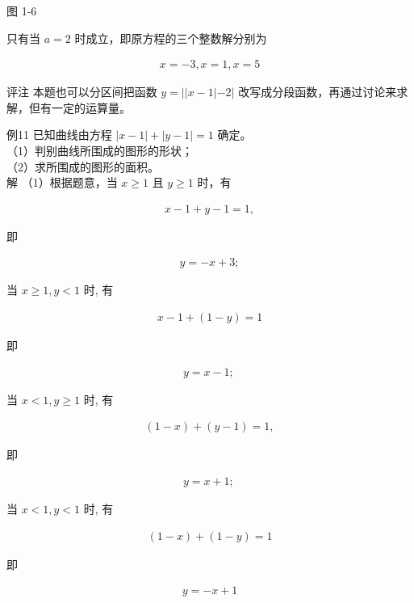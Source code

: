 \documentclass[10pt]{article}
\begin{document}
图 1-6

只有当 $a=2$ 时成立，即原方程的三个整数解分别为

\begin{align*}
x=-3, x=1, x=5
\end{align*}

评注 本题也可以分区间把函数 $y=||x-1|-2|$ 改写成分段函数，再通过讨论来求解，但有一定的运算量。

例11 已知曲线由方程 $|x-1|+|y-1|=1$ 确定。\\
（1）判别曲线所围成的图形的形状；\\
（2）求所围成的图形的面积。\\
解 （1）根据题意，当 $x \geqslant 1$ 且 $y \geqslant 1$ 时，有

\begin{align*}
x-1+y-1=1,
\end{align*}

即

\begin{align*}
y=-x+3 ;
\end{align*}

当 $x \geqslant 1, y<1$ 时, 有

\begin{align*}
x-1+(1-y)=1
\end{align*}

即

\begin{align*}
y=x-1 \text {; }
\end{align*}

当 $x<1, y \geqslant 1$ 时, 有

\begin{align*}
(1-x)+(y-1)=1,
\end{align*}

即

\begin{align*}
y=x+1 \text {; }
\end{align*}

当 $x<1, y<1$ 时, 有

\begin{align*}
(1-x)+(1-y)=1
\end{align*}

即

\begin{align*}
y=-x+1
\end{align*}
\end{document}
